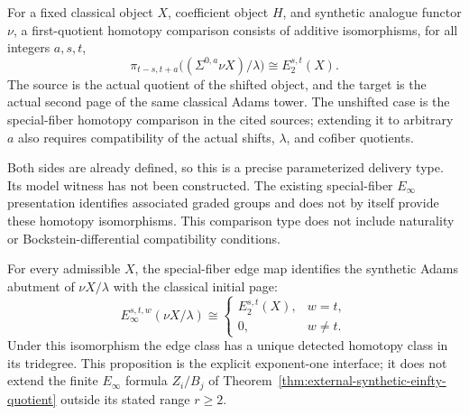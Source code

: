 \begin{definition}
  \label{def:synthetic-first-quotient-homotopy-comparison}
  \leanok
  For a fixed classical object $X$, coefficient object $H$, and synthetic
  analogue functor $\nu$, a first-quotient homotopy comparison consists of
  additive isomorphisms, for all integers $a,s,t$,
  \[
    \pi_{t-s,t+a}\bigl((\Sigma^{0,a}\nu X)/\lambda\bigr)
       \cong E_2^{s,t}(X).
  \]
  The source is the actual quotient of the shifted object, and the target
  is the actual second page of the same classical Adams tower.
  The unshifted case is the special-fiber homotopy comparison in the
  cited sources; extending it to arbitrary $a$ also requires compatibility
  of the actual shifts, $\lambda$, and cofiber quotients.

  Both sides are already defined, so this is a precise parameterized
  delivery type.  Its model witness has not been constructed.
  The existing special-fiber $E_\infty$ presentation identifies associated
  graded groups and does not by itself provide these homotopy isomorphisms.
  This comparison type does not include naturality or Bockstein-differential
  compatibility conditions.
\end{definition}

\begin{proposition}
  \label{prop:synthetic-einfty-first-quotient}
  \notready
  For every admissible $X$, the special-fiber edge map identifies the
  synthetic Adams abutment of $\nu X/\lambda$ with the classical initial page:
  \[
    E_\infty^{s,t,w}(\nu X/\lambda)\cong
    \begin{cases}
      E_2^{s,t}(X),&w=t,\\
      0,&w\ne t.
    \end{cases}
  \]
  Under this isomorphism the edge class has a unique detected homotopy class
  in its tridegree.  This proposition is the explicit exponent-one interface;
  it does not extend the finite $E_\infty$ formula $Z_i/B_j$ of
  Theorem~\ref{thm:external-synthetic-einfty-quotient} outside its stated
  range $r\ge2$.
\end{proposition}

